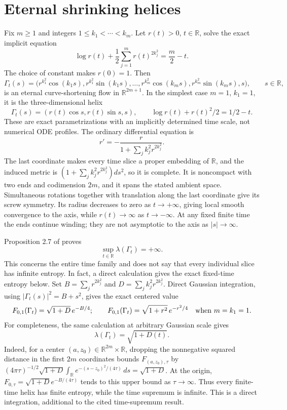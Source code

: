 \chapter{Eternal shrinking helices}\label{sec:catalogue-eternal-helices}
\begin{example}\label{ex:catalogue-eternal-helices}
Fix $m\geq1$ and integers $1\leq k_1<\cdots<k_m$. Let $r(t)>0$, $t\in\mathbb R$, solve the exact implicit equation
\[
 \log r(t)+\frac12\sum_{j=1}^m r(t)^{2k_j^2}=\frac m2-t.
\]
The choice of constant makes $r(0)=1$. Then
\[
 \Gamma_t(s)=
 \bigl(r^{k_1^2}\cos(k_1s),r^{k_1^2}\sin(k_1s),\ldots,
 r^{k_m^2}\cos(k_ms),r^{k_m^2}\sin(k_ms),s\bigr),
 \qquad s\in\mathbb R,
\]
is an eternal curve-shortening flow in $\mathbb R^{2m+1}$. In the simplest case $m=1$, $k_1=1$, it is the three-dimensional helix
\[
 \Gamma_t(s)=(r(t)\cos s,r(t)\sin s,s),\qquad
 \log r(t)+r(t)^2/2=1/2-t.
\]
These are exact parametrizations with an implicitly determined time scale, not numerical ODE profiles. The ordinary differential equation is
\[
 r'=-\frac{r}{1+\sum_j k_j^2r^{2k_j^2}}.
\]
The last coordinate makes every time slice a proper embedding of $\mathbb R$, and the induced metric is $(1+\sum_jk_j^2r^{2k_j^2})ds^2$, so it is complete. It is noncompact with two ends and codimension $2m$, and it spans the stated ambient space. Simultaneous rotations together with translation along the last coordinate give its screw symmetry. Its radius decreases to zero as $t\to+\infty$, giving local smooth convergence to the axis, while $r(t)\to\infty$ as $t\to-\infty$. At any fixed finite time the ends continue winding; they are not asymptotic to the axis as $|s|\to\infty$.

Proposition 2.7 of \cite{CatSS19} proves
\[
 \sup_{t\in\mathbb R}\lambda(\Gamma_t)=+\infty.
\]
This concerns the entire time family and does not say that every individual slice has infinite entropy. In fact, a direct calculation gives the exact fixed-time entropy below. Set $B=\sum_jr^{2k_j^2}$ and $D=\sum_jk_j^2r^{2k_j^2}$. Direct Gaussian integration, using $|\Gamma_t(s)|^2=B+s^2$, gives the exact centered value
\[
 F_{0,1}(\Gamma_t)=\sqrt{1+D}\,e^{-B/4};
 \qquad F_{0,1}(\Gamma_t)=\sqrt{1+r^2}\,e^{-r^2/4}
 \quad\hbox{when }m=k_1=1.
\]
For completeness, the same calculation at arbitrary Gaussian scale gives
\[
 \lambda(\Gamma_t)=\sqrt{1+D(t)}.
\]
Indeed, for a center $(a,z_0)\in\mathbb R^{2m}\times\mathbb R$, dropping the nonnegative squared distance in the first $2m$ coordinates bounds $F_{(a,z_0),\tau}$ by
$(4\pi\tau)^{-1/2}\sqrt{1+D}\int_{\mathbb R}e^{-(s-z_0)^2/(4\tau)}\,ds=\sqrt{1+D}$.
At the origin, $F_{0,\tau}=\sqrt{1+D}e^{-B/(4\tau)}$ tends to this upper bound as $\tau\to\infty$. Thus every finite-time helix has finite entropy, while the time supremum is infinite. This is a direct integration, additional to the cited time-supremum result.


\end{example}
